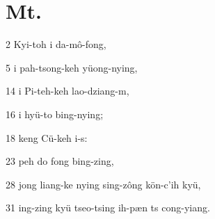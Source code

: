 \section{Mt.}%

\begin{sAbstract}
	\item[2] Kyi-toh i da-mô-fong,
	\item[5] i pah-tsong-keh yüong-nying,
	\item[14] i Pi-teh-keh lao-dziang-m,
	\item[16] i hyü-to bing-nying;
	\item[18] keng Cü-keh i-s:
	\item[23] peh do fong bing-zing,
	\item[28] jong liang-ke nying sing-zông kön-c'ih kyü,
	\item[31] ing-zing kyü tseo-tsing ih-pæn ts cong-yiang.
\end{sAbstract}

